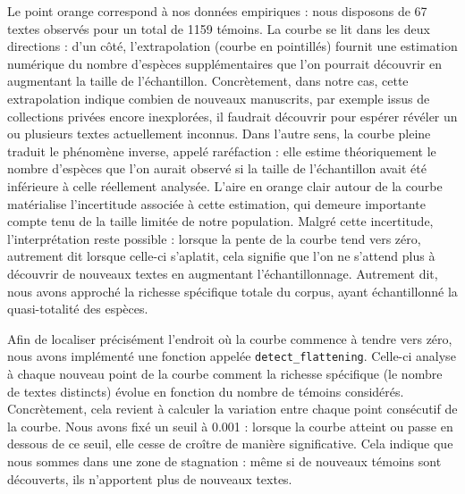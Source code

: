 \documentclass[a4paper,twoside,12pt]{book}
\begin{document}
Le point orange correspond à nos données empiriques : nous disposons de 67 textes observés pour un total de 1159 témoins. La courbe se lit dans les deux directions : d’un côté, l’extrapolation (courbe en pointillés) fournit une estimation numérique du nombre d’espèces supplémentaires que l’on pourrait découvrir en augmentant la taille de l’échantillon. Concrètement, dans notre cas, cette extrapolation indique combien de nouveaux manuscrits, par exemple issus de collections privées encore inexplorées, il faudrait découvrir pour espérer révéler un ou plusieurs textes actuellement inconnus. Dans l’autre sens, la courbe pleine traduit le phénomène inverse, appelé raréfaction : elle estime théoriquement le nombre d’espèces que l’on aurait observé si la taille de l’échantillon avait été inférieure à celle réellement analysée. L’aire en orange clair autour de la courbe matérialise l’incertitude associée à cette estimation, qui demeure importante compte tenu de la taille limitée de notre population. Malgré cette incertitude, l’interprétation reste possible : lorsque la pente de la courbe tend vers zéro, autrement dit lorsque celle-ci s’aplatit, cela signifie que l’on ne s’attend plus à découvrir de nouveaux textes en augmentant l’échantillonnage. Autrement dit, nous avons approché la richesse spécifique totale du corpus, ayant échantillonné la quasi-totalité des espèces.

Afin de localiser précisément l’endroit où la courbe commence à tendre vers zéro, nous avons implémenté une fonction appelée \texttt{detect\_flattening}. Celle-ci analyse à chaque nouveau point de la courbe comment la richesse spécifique (le nombre de textes distincts) évolue en fonction du nombre de témoins considérés. Concrètement, cela revient à calculer la variation entre chaque point consécutif de la courbe. Nous avons fixé un seuil à 0.001 : lorsque la courbe atteint ou passe en dessous de ce seuil, elle cesse de croître de manière significative. Cela indique que nous sommes dans une zone de stagnation : même si de nouveaux témoins sont découverts, ils n’apportent plus de nouveaux textes.
\end{document}
